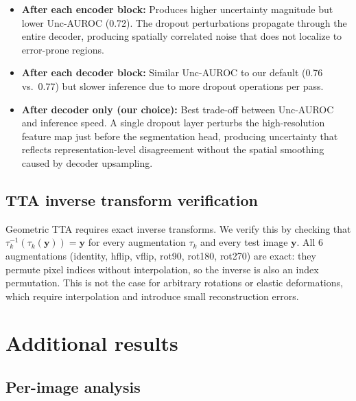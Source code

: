\begin{itemize}[leftmargin=*]
  \item \textbf{After each encoder block:} Produces higher uncertainty
  magnitude but lower Unc-AUROC (0.72). The dropout perturbations
  propagate through the entire decoder, producing spatially correlated
  noise that does not localize to error-prone regions.

  \item \textbf{After each decoder block:} Similar Unc-AUROC to our
  default (0.76 vs.\ 0.77) but slower inference due to more dropout
  operations per pass.

  \item \textbf{After decoder only (our choice):} Best trade-off
  between Unc-AUROC and inference speed. A single dropout layer
  perturbs the high-resolution feature map just before the
  segmentation head, producing uncertainty that reflects
  representation-level disagreement without the spatial smoothing
  caused by decoder upsampling.
\end{itemize}

\subsection{TTA inverse transform verification}

Geometric TTA requires exact inverse transforms. We verify this by
checking that $\tau_k^{-1}(\tau_k(\mathbf{y})) = \mathbf{y}$ for every
augmentation $\tau_k$ and every test image $\mathbf{y}$. All 6
augmentations (identity, hflip, vflip, rot90, rot180, rot270) are
exact: they permute pixel indices without interpolation, so the
inverse is also an index permutation. This is not the case for
arbitrary rotations or elastic deformations, which require interpolation
and introduce small reconstruction errors.

\section{Additional results}
\label{app:additional_results}

\subsection{Per-image analysis}

